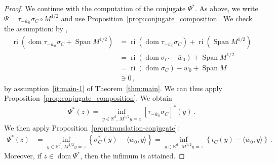 \documentclass[11pt,english,reqno]{article}
\DeclareMathOperator{\Span}{Span}
\DeclareMathOperator{\dom}{dom}
\DeclareMathOperator{\ri}{ri}
\newcommand{\R}{\mathbb{R}}
\theoremstyle{plain}
\theoremstyle{definition}
\theoremstyle{remark}
\numberwithin{equation}{section}
\begin{document}
\begin{proof}
We continue with the computation of the conjugate $\Psi^*$. As above, we write $\Psi = \tau_{-\overline{w}_0}\sigma_C \circ M^{1/2}$ and use Proposition~\ref{prop:conjugate_composition}. We check the assumption: by \cite[Coro.~6.6.2]{rockafellar1970convex}, 
\begin{align*}
	\ri(\dom \tau_{-\overline{w}_0} \sigma_C + \Span M^{1/2}) &= \ri(\dom \tau_{-\overline{w}_0} \sigma_C) + \ri(\Span M^{1/2}) \\
	&= \ri(\dom \sigma_C - \overline{w}_0) + \Span M^{1/2} \\
	&= \ri(\dom \sigma_C) - \overline{w}_0 + \Span M \\
	&\ni 0 \, , 
\end{align*}
by assumption~\ref{it:main-1} of Theorem~\ref{thm:main}. We can thus apply Proposition~\ref{prop:conjugate_composition}. We obtain
\begin{align*}
	\Psi^*(z) = \inf_{y \in \R^d, \,  M^{1/2}y=z} \left[\tau_{-\overline{w}_0}\sigma_C\right]^*(y) \, .
\end{align*}
We then apply Proposition~\ref{prop:translation-conjugate}:
\begin{align}
	\label{eq:conjugate-psi}
	\Psi^*(z) &= \inf_{y \in \R^d, \,  M^{1/2}y=z} \left\{\sigma_C^*(y) - \langle \overline{w}_0, y \rangle \right\}  = \inf_{y \in \R^d, \,  M^{1/2}y=z} \left\{\iota_{C}(y) - \langle \overline{w}_0, y \rangle \right\} \, . 
\end{align}
Moreover, if $z \in \dom \Psi^*$, then the infimum is attained.


\end{proof}
\end{document}
